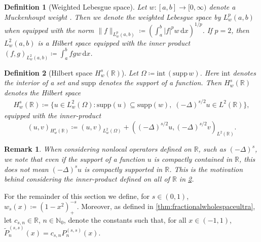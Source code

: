 \documentclass[10pt,a4paper]{article}
\newcommand{\dx}{\mathrm{d}x}
\newcommand{\supp}{\mathrm{supp}}
\newcommand{\eP}{\tilde{P}}
\newtheorem{definition}{Definition}[section]
\newtheorem{remark}{Remark}[section]
\numberwithin{equation}{section}
\begin{document}
\begin{definition}[Weighted Lebesgue space]
Let $w :  [a,b]  \to [0,\infty)$ denote a Muckenhoupt weight \cite{muckenhoupt1972}. Then we denote the weighted Lebesgue space by $L^p_w(a,b)$ when equipped with the norm $\|f\|_{L^p_w(a,b)} \coloneqq (\int_{a}^b |f|^p w \, \dx)^{1/p}$. If $p=2$, then $L^2_w(a,b)$ is a Hilbert space equipped with the inner product $(f,g)_{L^2_w(a,b)} \coloneqq \int_{a}^b f g w \, \dx$.
\end{definition}

\begin{definition}[Hilbert space $H^s_w(\mathbb{R})$]
\label{def:Hsw}
 Let $\Omega \coloneqq \mathrm{int} \, (\supp \, w)$. Here $\mathrm{int}$ denotes the interior of a set and $\supp$ denotes the support of a function.  Then $H^s_w(\mathbb{R})$ denotes the Hilbert space 
\begin{align}
H^s_w(\mathbb{R}) \coloneqq
\{ u \in L^2_w( \Omega ) : \supp(u) \subseteq \supp(w), \; (-\Delta)^{s/2} u \in L^2(\mathbb{R})\},
\end{align}
equipped with the inner-product $$( u, v )_{H^s_w(\mathbb{R})} \coloneqq ( u, v )_{L^2_w( \Omega )} +  ((-\Delta)^{s/2} u,  (-\Delta)^{s/2} v )_{L^2(\mathbb{R})}.$$ 
\end{definition}

\begin{remark}
When considering nonlocal operators defined on $\mathbb{R}$, such as $(-\Delta)^s$, we note that even if the support of a function $u$ is compactly contained in $\mathbb{R}$, this does not mean $(-\Delta)^s u$ is compactly supported in $\mathbb{R}$. This is the motivation behind considering the inner-product defined on all of $\mathbb{R}$ in \cref{def:Hsw}.
\end{remark}


For the remainder of this section we define, for $s \in (0,1)$, $w_s(x) \coloneqq (1-x^2)_+^{-s}$. Moreover, as defined in \cref{thm:fractionalwholespaceultra}, let $c_{s,n} \in \mathbb{R}$, $n \in \mathbb{N}_0$, denote the constants such that, for all $x \in (-1,1)$, $\eP_n^{(s,s)}(x) = c_{s,n} P_n^{(s,s)}(x)$.
\end{document}
